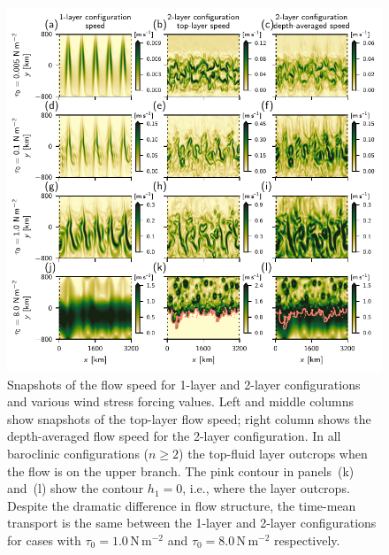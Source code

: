 \documentclass{agujournal2019}
\newcommand{\Pa}		{\mathrm{N}\,\mathrm{m}^{-2}}
\begin{document}
\begin{figure}
\centering
\noindent\includegraphics{snapshots}
\caption{Snapshots of the flow speed for 1-layer and 2-layer configurations and various wind stress forcing values. Left and middle columns show snapshots of the top-layer flow speed; right column shows the depth-averaged flow speed for the 2-layer configuration. In all baroclinic configurations ($n\ge 2$) the top-fluid layer outcrops when the flow is on the upper branch. The pink contour in panels~(k) and~(l) show the contour $h_1=0$, i.e., where the layer outcrops. Despite the dramatic difference in flow structure, the time-mean transport is the same {\color{black}between the 1-layer and 2-layer configurations} for cases with $\tau_0=1.0\,\Pa$ and $\tau_0=8.0\,\Pa$ {\color{black}respectively}.}\label{fig:snapshots}
\end{figure}
\end{document}
